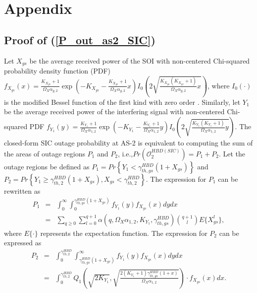 \chapter{Appendix}
\label{chap:Appendix}
\section{Proof of (\ref{P_out_as2_SIC})} \label{SIC_proof}
Let $X_{gs}$ be the average received power of the SOI with non-centered Chi-squared probability density function (PDF) $f_{X_{gs}}(x) = \frac{K_{X_{gs}}+1}{\Omega_{X}\alpha_{g,2}} \exp\left(-K_{X_{gs}}-\frac{K_{X_{gs}} + 1}{\Omega_{X}\alpha_{g,2}}x\right)I_{0}\left(2\sqrt{\frac{K_{X_{gs}}(K_{X_{gs}}+1)}{\Omega_{X}\alpha_{g,2}}x}\right)$, where $I_{0}\left(\cdot\right)$ is the modified Bessel function of the first kind with zero order \cite{gradshteyn2014table}. Similarly, let $Y_1$ be the average received power of the interfering signal with non-centered Chi-squared PDF $f_{Y_1}(y) = \frac{K_{Y_1}+1}{\Omega_{X}\alpha_{1,2}}\exp\left(-K_{Y_1}-\frac{K_{Y_1} + 1}{\Omega_{X}\alpha_{1,2}}y\right) I_{0}\left(2\sqrt{\frac{K_{Y_1}(K_{Y_1}+1)}{\Omega_{X}\alpha_{1,2}}y}\right)$. The closed-form SIC outage probability at AS-2 is equivalent to computing the sum of the areas of outage regions $P_1$ and $P_2$, i.e.,$Pr(\mathcal{O}_{2}^{HBD(SIC)}) = P_1 + P_2$. Let the outage regions be defined as $P_1 = Pr\left\{Y_1 < \gamma_{th,gs}^{HBD}\left(1+X_{gs}\right) \right\}$ and $P_2 = Pr\left\{Y_1 \geq \gamma_{th,2}^{HBD}(1+X_{gs}), X_{gs} < \gamma_{th,2}^{HBD} \right\}$. The expression for $P_1$ can be rewritten as \cite{rached2017unified}
\begin{eqnarray} \label{eq_P1_2}
P_1 & = & \int_{0}^{\infty} \int_{0}^{\gamma_{th,gs}^{HBD}(1+X_{gs})} f_{Y_1}(y) f_{X_{gs}}(x) dydx \nonumber\\
& = & \sum_{q\geq0}\sum_{l=0}^{q+1}\alpha(q,\Omega_X\alpha_{1,2},K_{Y_{1}},\gamma_{th,gs}^{HBD})\binom{q+1}{l}E\{X_{gs}^l\},
\end{eqnarray}
where $E\{\cdot\}$ represents the expectation function. The expression for $P_2$ can be expressed as
\begin{eqnarray} \label{eq_P2_2}
P_2 & = & \int_{0}^{\gamma_{th,2}^{HBD}} \int_{\gamma_{th,gs}^{HBD}(1+X_{gs})}^{\infty} f_{Y_1}(y) f_{X_{gs}}(x) dydx \nonumber\\
& = & \int_{0}^{\gamma_{th,2}^{HBD}} Q_1\left( \sqrt{2K_{Y_1}}, \sqrt{\frac{2(K_{Y_1}+1)\gamma_{th,gs}^{HBD}(1+x)}{\Omega_{X}\alpha_{1,2}}} \right) \cdot f_{X_{gs}}(x) dx. 
\end{eqnarray}

